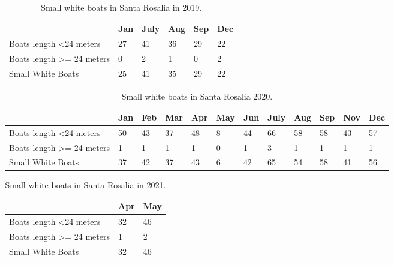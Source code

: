 \begin{table}[h!]
\begin{tabular}{|l|l|l|l|l|l|}
\hline
                                       & Jan & July & Aug & Sep & Dec \\ \hline
Boats length \textless 24 meters       & 27  & 41   & 36  & 29  & 22  \\ \hline
Boats length \textgreater{}= 24 meters & 0   & 2    & 1   & 0   & 2   \\ \hline
Small White Boats                      & 25  & 41   & 35  & 29  & 22  \\ \hline
\end{tabular}
\caption{Small white boats in Santa Rosalia in 2019.}
\end{table}


\begin{table}[h!]
\begin{tabular}{|l|l|l|l|l|l|l|l|l|l|l|l|}
\hline
                                       & Jan & Feb & Mar & Apr & May & Jun & July & Aug & Sep & Nov & Dec \\ \hline
Boats length \textless 24 meters       & 50  & 43  & 37  & 48  & 8   & 44  & 66   & 58  & 58  & 43  & 57  \\ \hline
Boats length \textgreater{}= 24 meters & 1   & 1   & 1   & 1   & 0   & 1   & 3    & 1   & 1   & 1   & 1   \\ \hline
Small White Boats                      & 37  & 42  & 37  & 43  & 6   & 42  & 65   & 54  & 58  & 41  & 56  \\ \hline
\end{tabular}
\caption{Small white boats in Santa Rosalia 2020.}
\end{table}



\begin{table}[h!]
\begin{tabular}{|l|l|l|}
\hline
                                       & Apr & May \\ \hline
Boats length \textless 24 meters       & 32  & 46  \\ \hline
Boats length \textgreater{}= 24 meters & 1   & 2   \\ \hline
Small White Boats                      & 32  & 46  \\ \hline
\end{tabular}
\caption{Small white boats in Santa Rosalia in 2021.}
\end{table}



